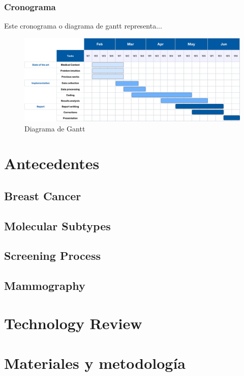 \documentclass[a4paper,10pt]{book}
\begin{document}
\subsection{Cronograma}

Este cronograma o diagrama de gantt representa...

\begin{figure}[h!]
    \centering
    \includegraphics[width=1\linewidth]{reports//assets/RoadmapV3.png}
    \caption{Diagrama de Gantt}
    \label{fig:roadmap}
\end{figure}




\chapter{Antecedentes}

\section{Breast Cancer}
\section{Molecular Subtypes}
\section{Screening Process}
\section{Mammography}


\chapter{Technology Review}


\chapter{Materiales y metodología}
\end{document}
